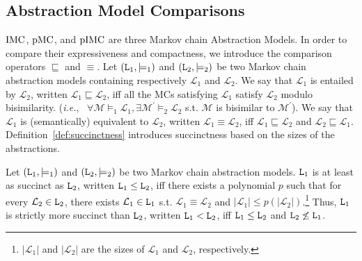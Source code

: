 \documentclass{llncs}
\newcommand{\mc}{\textnormal{MC}}
\newcommand{\imc}{\textnormal{IMC}}
\newcommand{\pimc}{\textnormal{pIMC}}
\newcommand{\pmc}{\textnormal{pMC}}
\newcommand{\csp}{\textnormal{CSP}}
\newcommand{\aminstance}{\ensuremath{{\tt L}}}
\newcommand{\entailed}{\ensuremath{\sqsubseteq}}
\newcommand{\ie} {{\em i.e.},\ }
\newcommand{\Inter}  {\ensuremath{{\mathbb{I}}}}
\newcommand{\Qset}             {\ensuremath{\mathbb{Q}}}
\newcommand{\custompar}[1]{\smallskip \noindent {\bf #1}}
\begin{document}
\smallskip



\subsection{Abstraction Model Comparisons}

${\imc}$, ${\pmc}$, and ${\pimc}$ are three Markov chain Abstraction Models.
In order to compare their expressiveness and  compactness, we introduce
the comparison operators $\entailed$ and $\equiv$.
Let $(\aminstance_1, \models_1)$ and $(\aminstance_2,\models_2\nobreak)$ be two Markov chain abstraction models
containing respectively $\mathcal{L}_1$ and $\mathcal{L}_2$.
We say that $\mathcal{L}_1$ is entailed by $\mathcal{L}_2$, 
written $\mathcal{L}_1 \entailed \mathcal{L}_2$,
iff all the {\mc}s satisfying $\mathcal{L}_1$ satisfy $\mathcal{L}_2$
modulo bisimilarity.
(\ie 
$\forall \mathcal{M} \models_1 \mathcal{L}_1, \exists \mathcal{M}^\prime \models_2 \mathcal{L}_2$ s.t. $\mathcal{M}$ is bisimilar to $\mathcal{M}^\prime$).
We say that $\mathcal{L}_1$ is (semantically) equivalent to $\mathcal{L}_2$, 
written $\mathcal{L}_1 \equiv \mathcal{L}_2$,
iff $\mathcal{L}_1 \entailed \mathcal{L}_2$ and $\mathcal{L}_2 \entailed \mathcal{L}_1$.
Definition~\ref{def:succinctness} introduces succinctness based on the sizes of the abstractions. 



\begin{definition}[Succinctness]\label{def:succinctness}
	Let $(\aminstance_1, \models_1)$ and $(\aminstance_2, \models_2)$ be two Markov chain abstraction models.
    $\aminstance_1$ is at least as succinct as $\aminstance_2$, 
    written $\aminstance_1 \leq \aminstance_2$, 
    iff there exists a polynomial $p$ such that for every 
    $\mathcal{L}_2 \in \aminstance_2$, 
    there exists $\mathcal{L}_1 \in \aminstance_1$ 
    s.t. $\mathcal{L}_1 \equiv \mathcal{L}_2$ and 
    $|\mathcal{L}_1| \leq p(|\mathcal{L}_2|)$.\footnote{
    $|\mathcal{L}_1|$ and $|\mathcal{L}_2|$ are the sizes of $\mathcal{L}_1$ and
    $\mathcal{L}_2$, respectively.}
    Thus, $\aminstance_1$ is strictly more succinct than $\aminstance_2$,
    written $\aminstance_1 < \aminstance_2$, iff
    $\aminstance_1 \leq \aminstance_2$
    and $\aminstance_2 \not\leq \aminstance_1$.
\end{definition}
\end{document}
